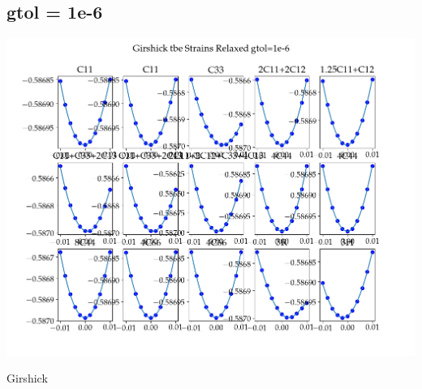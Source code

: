 \documentclass[11pt]{article}
\begin{document}
\subsection{gtol = 1e-6}
\label{sec:org42d04e1}
\begin{center}
\includegraphics[width=.9\linewidth]{Images/girshick_ec_09-01-19_gtol1e-6.png}
\end{center}
Girshick 
\end{document}
